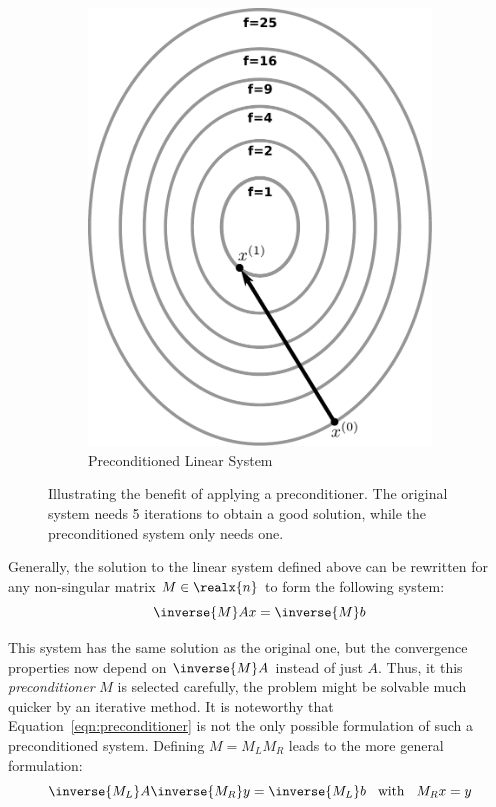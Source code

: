 \begin{figure}
\begin{subfigure}{.5\textwidth}
  \includegraphics[width=1.015\linewidth]{chapters/2_solvers/2_3_iterative_solvers/figures/preconditioner.pdf}
  \caption{Preconditioned Linear System}
  \label{fig:preconditioner}
\end{subfigure}
\caption{Illustrating the benefit of applying a preconditioner. The original system needs 5 iterations to obtain a good solution, while the preconditioned system only needs one.}
\label{fig:preconditioning}
\end{figure}

Generally, the solution to the linear system defined above can be rewritten for any non-singular matrix $M \in \realx{n}$ to form the following system:
\begin{equation}
\label{eqn:preconditioner}
    \inverse
    {M}Ax = \inverse{M}b
\end{equation}

\noindent This system has the same solution as the original one, but the convergence properties now depend on $\inverse{M}A$ instead of just $A$. Thus, it this \textit{preconditioner} $M$ is selected carefully, the problem might be solvable much quicker by an iterative method. It is noteworthy that Equation~\hyperref[eqn:preconditioner]{\ref{eqn:preconditioner}} is not the only possible formulation of such a preconditioned system. Defining $M=M_LM_R$ leads to the more general formulation:
\begin{equation}
    \inverse{M_L}A\inverse{M_R}y = \inverse{M_L}b\;\; \text{ with }\;\; M_Rx=y
\end{equation}

